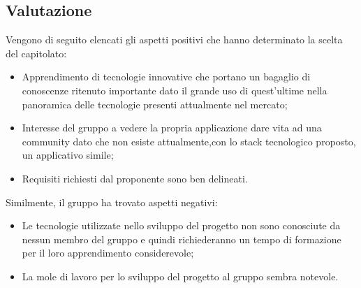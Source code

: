 \subsection{Valutazione}
        Vengono di seguito elencati gli aspetti positivi che hanno determinato la scelta del capitolato:
        \begin{itemize}
        \item Apprendimento di tecnologie innovative che portano un bagaglio di conoscenze ritenuto importante dato il grande uso 			di quest'ultime nella panoramica delle tecnologie presenti attualmente nel mercato;
        \item Interesse del gruppo a vedere la propria applicazione dare vita ad una community dato che non esiste attualmente,con 		lo stack tecnologico proposto, un applicativo simile;
        \item Requisiti richiesti dal proponente sono ben delineati.
        \end{itemize}
		Similmente, il gruppo ha trovato aspetti negativi:
        \begin{itemize}
        \item Le tecnologie utilizzate nello sviluppo del progetto non sono conosciute da nessun membro del gruppo \GroupName e
        quindi richiederanno un tempo di formazione per il loro apprendimento considerevole;
        \item La mole di lavoro per lo sviluppo del progetto al gruppo sembra notevole.
        \end{itemize}
        
